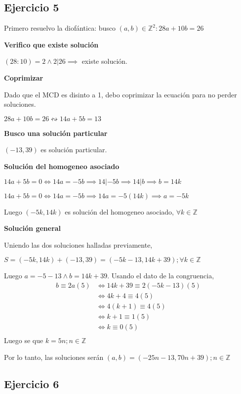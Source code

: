 \subsection{Ejercicio 5}

Primero resuelvo la diofántica: busco $ (a,b) \in \mathbb{Z}^2: 28a+10b = 26 $

\textbf{Verifico que existe solución}

$ (28:10) = 2 \wedge 2|26 \implies $ existe solución.

\textbf{Coprimizar}

Dado que el MCD es disinto a 1, debo coprimizar la ecuación para no perder soluciones.

$ 28a+10b =26 \leftrightsquigarrow 14a+5b=13$

\textbf{Busco una solución particular}

$ (-13,39) $ es solución particular.

\textbf{Solución del homogeneo asociado}

$ 14a+5b = 0 \iff 14a = -5b \implies 14|-5b \implies 14|b \implies b=14k $

$ 14a+5b = 0 \iff 14a = -5b \implies 14a = -5(14k) \implies a = -5k $

Luego $ (-5k, 14k) $ es solución del homogeneo asociado, $ \forall k \in \mathbb{Z} $

\textbf{Solución general}

Uniendo las dos soluciones halladas previamente,

$ S = (-5k, 14k) + (-13,39) = (-5k-13, 14k+39); \forall k \in \mathbb{Z} $

Luego $ a = -5-13 \wedge b= 14k+39 $. Usando el dato de la congruencia,
\begin{align*}
    b\equiv 2a(5) &\iff 14k+39 \equiv 2(-5k-13)(5) \\
    &\iff 4k+4 \equiv 4(5) \\
    &\iff 4(k+1) \equiv 4(5) \\
    &\iff k+1 \equiv 1(5) \\
    &\iff k \equiv 0(5) \\
\end{align*}
Luego se que $ k = 5n; n \in \mathbb{Z} $

Por lo tanto, las soluciones serán $ (a,b) = (-25n-13, 70n+39 ); n \in \mathbb{Z} $

\subsection{Ejercicio 6}


